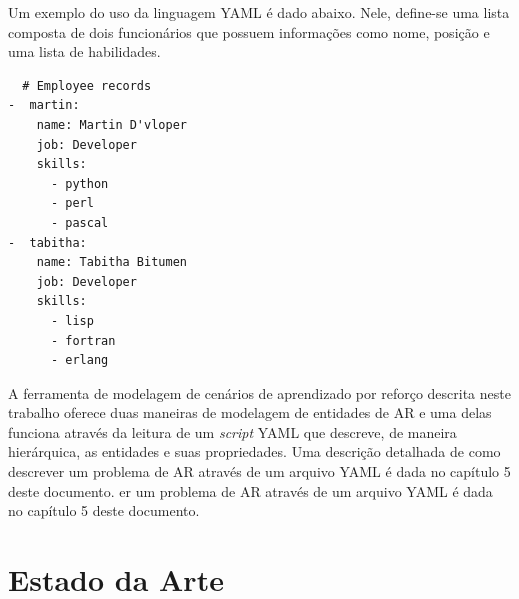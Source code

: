 \documentclass[cic,tc]{iiufrgs}
\begin{document}


Um exemplo do uso da linguagem YAML é dado abaixo. Nele, define-se uma lista composta de dois
funcionários que possuem informações como nome, posição e uma lista de habilidades.

\begin{verbatim}
  # Employee records
-  martin:
    name: Martin D'vloper
    job: Developer
    skills:
      - python
      - perl
      - pascal
-  tabitha:
    name: Tabitha Bitumen
    job: Developer
    skills:
      - lisp
      - fortran
      - erlang
\end{verbatim}


A ferramenta de modelagem de cenários de aprendizado por reforço descrita neste trabalho oferece duas maneiras de modelagem de entidades de AR e uma delas
funciona através da leitura de um \textit{script} YAML que descreve, de maneira hierárquica, as entidades e suas propriedades. Uma descrição detalhada de como
descrever um problema de AR através de um arquivo YAML é dada no capítulo 5 deste documento.
er um problema de AR através de um arquivo YAML é dada no capítulo 5 deste documento.

\chapter{Estado da Arte}
\label{estadodaarte}
\end{document}
